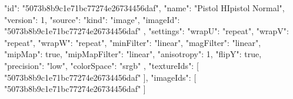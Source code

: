 {
  "id": "5073b8b9c1e71bc77274e26734456daf",
  "name": "Pistol HIpistol Normal",
  "version": 1,
  "source": {
    "kind": "image",
    "imageId": "5073b8b9c1e71bc77274e26734456daf"
  },
  "settings": {
    "wrapU": "repeat",
    "wrapV": "repeat",
    "wrapW": "repeat",
    "minFilter": "linear",
    "magFilter": "linear",
    "mipMap": true,
    "mipMapFilter": "linear",
    "anisotropy": 1,
    "flipY": true,
    "precision": "low",
    "colorSpace": "srgb"
  },
  "textureIds": [
    "5073b8b9c1e71bc77274e26734456daf"
  ],
  "imageIds": [
    "5073b8b9c1e71bc77274e26734456daf"
  ]
}
